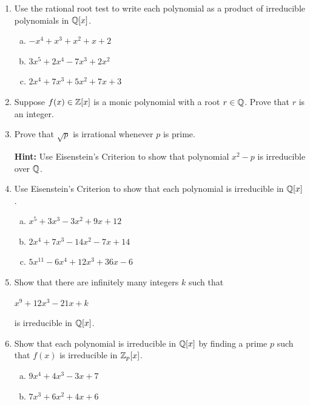 \documentclass[11pt,fleqn,dvipsnames,usenames]{article}
\newcommand{\p}{\noindent}
\begin{document}
\p {\huge \S5.5 Problems}
\vsp
\begin{enumerate}[1.]
\item Use the rational root test to write each polynomial as a product of irreducible polynomials in $\mathbb{Q}[x]$.
\begin{enumerate}[(a)]
\item $-x^4 + x^3 + x^2 + x + 2$
\item $3x^5 + 2x^4 - 7x^3 + 2x^2$
\item $2x^4 + 7x^3 + 5x^2 + 7x + 3$
\end{enumerate}
\item Suppose $f(x)\in \mathbb{Z}[x]$ is a monic polynomial with a root $r\in \mathbb{Q}$.  Prove that $r$ is an integer.
\item Prove that $\sqrt{p}$ is irrational whenever $p$ is prime.

\textbf{Hint:} Use Eisenstein's Criterion to show that polynomial $x^2 - p$ is irreducible over $\mathbb{Q}$.

\item Use Eisenstein's Criterion to show that each polynomial is irreducible in $\mathbb{Q}[x]$.
\begin{enumerate}[(a)]
\item $x^5 + 3x^3 - 3x^2 + 9x + 12$
\item $2x^4 + 7x^3 - 14x^2 - 7x + 14$
\item $5x^{11} - 6x^4 + 12x^3 + 36x - 6$
\end{enumerate}
\item Show that there are infinitely many integers $k$ such that
\begin{center}
$x^9 + 12x^3 - 21x + k$
\end{center}
is irreducible in $\mathbb{Q}[x]$.
\item Show that each polynomial is irreducible in $\mathbb{Q}[x]$ by finding a prime $p$ such that $f(x)$ is irreducible in $\mathbb{Z}_{p}[x]$.
\begin{enumerate}[(a)]
\item $9x^4 + 4x^3 - 3x + 7$
\item $7x^3 + 6x^2 + 4x + 6$
\end{enumerate}
\end{enumerate}
\end{document}
